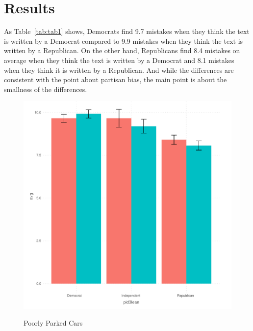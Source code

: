 \documentclass[12pt, letterpaper]{article}
\begin{document}
\section{Results}

As Table~\ref{tab:tab1} shows, Democrats find 9.7 mistakes when they think the text is written by a Democrat compared to 9.9 mistakes when they think the text is written by a Republican. On the other hand, Republicans find 8.4 mistakes on average when they think the text is written by a Democrat and 8.1 mistakes when they think it is written by a Republican. And while the differences are consistent with the point about partisan bias, the main point is about the smallness of the differences. 


\begin{figure}[!htbp]
\centering
\caption{Poorly Parked Cars}
\includegraphics[scale=.6]{../figs/error.pdf}
\label{fig:mistakes_rep}
\end{figure}
\end{document}
